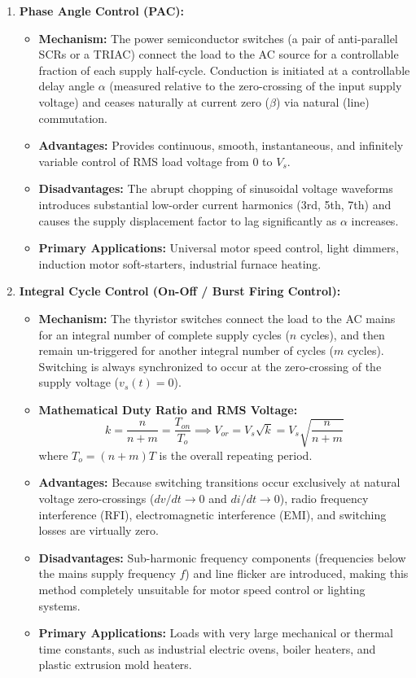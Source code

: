 \documentclass[11pt,a4paper]{article}
\begin{document}
\begin{enumerate}[leftmargin=*]
  \item \textbf{Phase Angle Control (PAC):}
  \begin{itemize}[leftmargin=*]
    \item \textbf{Mechanism:} The power semiconductor switches (a pair of anti-parallel SCRs or a TRIAC) connect the load to the AC source for a controllable fraction of each supply half-cycle. Conduction is initiated at a controllable delay angle $\alpha$ (measured relative to the zero-crossing of the input supply voltage) and ceases naturally at current zero ($\beta$) via natural (line) commutation.
    \item \textbf{Advantages:} Provides continuous, smooth, instantaneous, and infinitely variable control of RMS load voltage from $0$ to $V_s$.
    \item \textbf{Disadvantages:} The abrupt chopping of sinusoidal voltage waveforms introduces substantial low-order current harmonics (3rd, 5th, 7th) and causes the supply displacement factor to lag significantly as $\alpha$ increases.
    \item \textbf{Primary Applications:} Universal motor speed control, light dimmers, induction motor soft-starters, industrial furnace heating.
  \end{itemize}

  \item \textbf{Integral Cycle Control (On-Off / Burst Firing Control):}
  \begin{itemize}[leftmargin=*]
    \item \textbf{Mechanism:} The thyristor switches connect the load to the AC mains for an integral number of complete supply cycles ($n$ cycles), and then remain un-triggered for another integral number of cycles ($m$ cycles). Switching is always synchronized to occur at the zero-crossing of the supply voltage ($v_s(t) = 0$).
    \item \textbf{Mathematical Duty Ratio and RMS Voltage:}
    \begin{equation}
    k = \frac{n}{n + m} = \frac{T_{on}}{T_o} \implies V_{or} = V_s \sqrt{k} = V_s \sqrt{\frac{n}{n + m}}
    \end{equation}
    where $T_o = (n + m)T$ is the overall repeating period.
    \item \textbf{Advantages:} Because switching transitions occur exclusively at natural voltage zero-crossings ($dv/dt \to 0$ and $di/dt \to 0$), radio frequency interference (RFI), electromagnetic interference (EMI), and switching losses are virtually zero.
    \item \textbf{Disadvantages:} Sub-harmonic frequency components (frequencies below the mains supply frequency $f$) and line flicker are introduced, making this method completely unsuitable for motor speed control or lighting systems.
    \item \textbf{Primary Applications:} Loads with very large mechanical or thermal time constants, such as industrial electric ovens, boiler heaters, and plastic extrusion mold heaters.
  \end{itemize}


\end{enumerate}
\end{document}
